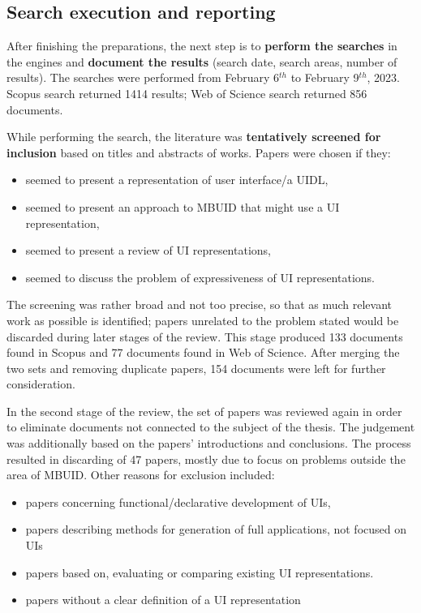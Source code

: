 \subsection{Search execution and reporting}\label{subsec:search-execution-and-reporting}

After finishing the preparations, the next step is to \textbf{perform the searches} in the engines and \textbf{document the results} (search date, search areas, number of results).
The searches were performed from February 6$^{th}$ to February 9$^{th}$, 2023.
Scopus search returned 1414 results;
Web of Science search returned 856 documents.

While performing the search, the literature was \textbf{tentatively screened for inclusion} based on titles and abstracts of works.
Papers were chosen if they:
\begin{itemize}
    \item seemed to present a representation of user interface/a UIDL,
    \item seemed to present an approach to MBUID that might use a UI representation,
    \item seemed to present a review of UI representations,
    \item seemed to discuss the problem of expressiveness of UI representations.
\end{itemize}
The screening was rather broad and not too precise, so that as much relevant work as possible is identified;
papers unrelated to the problem stated would be discarded during later stages of the review.
This stage produced 133 documents found in Scopus and 77 documents found in Web of Science.
After merging the two sets and removing duplicate papers, 154 documents were left for further consideration.

In the second stage of the review, the set of papers was reviewed again in order to eliminate documents not connected to the subject of the thesis.
The judgement was additionally based on the papers' introductions and conclusions.
The process resulted in discarding of 47 papers, mostly due to focus on problems outside the area of MBUID\@.
Other reasons for exclusion included:
\begin{itemize}
    \item papers concerning functional/declarative development of UIs,
    \item papers describing methods for generation of full applications, not focused on UIs
    \item papers based on, evaluating or comparing existing UI representations.
    \item papers without a clear definition of a UI representation
\end{itemize}

